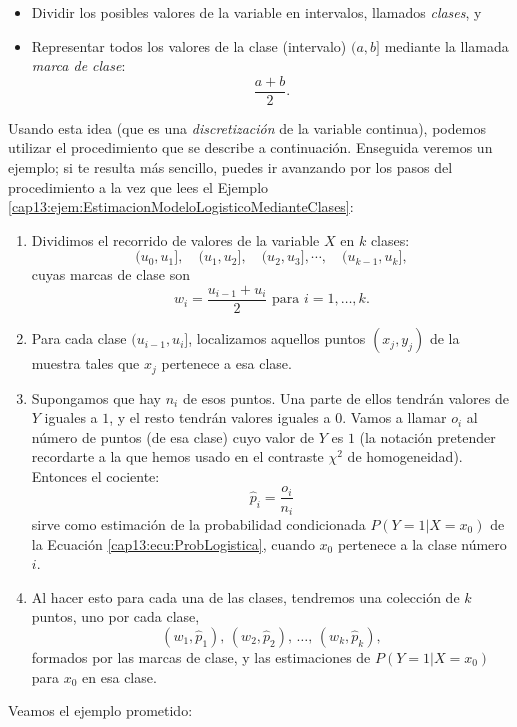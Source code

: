 \begin{itemize}

  \item Dividir los posibles valores de la variable en intervalos, llamados {\em clases}, y

  \item Representar todos los valores de la clase (intervalo) $(a,b]$ mediante la llamada {\em marca de clase}:
      \[\dfrac{a+b}{2}.\]
\end{itemize}
Usando esta idea (que es una {\em discretización} de la variable continua), podemos utilizar el procedimiento que se describe a continuación. Enseguida  veremos un ejemplo; si te resulta más sencillo, puedes ir avanzando por los pasos del procedimiento a la vez que lees el Ejemplo \ref{cap13:ejem:EstimacionModeloLogisticoMedianteClases}:
\begin{enumerate}
  \item Dividimos el recorrido de valores de la variable $X$ en $k$ clases:
  \[(u_0,u_1],\quad (u_1,u_2],\quad (u_2,u_3],\cdots,\quad (u_{k-1},u_k],\]
  cuyas marcas de clase son
  \[w_i=\dfrac{u_{i-1}+u_{i}}{2}\mbox{ para }i=1,\ldots, k.\]
  \item Para cada clase $(u_{i-1},u_i]$, localizamos aquellos puntos $(x_j,y_j)$ de la muestra tales que $x_j$ pertenece a esa clase.
  \item Supongamos que hay  $n_i$ de esos puntos. Una parte de ellos tendrán valores de $Y$ iguales a $1$, y el resto tendrán valores iguales a $0$. Vamos a llamar $o_i$ al número de puntos (de esa clase) cuyo valor de $Y$ es $1$ (la notación pretender recordarte a la que hemos usado en el contraste $\chi^2$ de homogeneidad). Entonces el cociente:
      \begin{equation}
      \label{cap13:ecu:EstimacionProbabilidadFactorIgual1EnUnaClase}
        \hat p_i=\dfrac{o_i}{n_i}
      \end{equation}
      sirve como estimación de la probabilidad condicionada $P(Y=1|X=x_0)$ de la Ecuación \ref{cap13:ecu:ProbLogistica}, cuando $x_0$ pertenece a la clase número $i$.

  \item Al hacer esto para cada una de las clases, tendremos una colección de $k$ puntos, uno por cada clase,
      \[(w_1,\hat p_1),\, (w_2,\hat p_2),\,\ldots,\, (w_k,\hat p_k),\]
      formados por las marcas de clase, y las estimaciones de $P(Y=1|X=x_0)$ para $x_0$ en esa clase.
\end{enumerate}
Veamos el ejemplo prometido:
